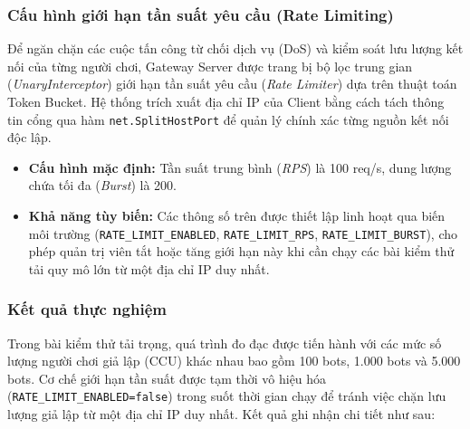 \documentclass[../Project.tex]{subfiles}
\begin{document}
\subsubsection{Cấu hình giới hạn tần suất yêu cầu (Rate Limiting)}
Để ngăn chặn các cuộc tấn công từ chối dịch vụ (DoS) và kiểm soát lưu lượng kết nối của từng người chơi, Gateway Server được trang bị bộ lọc trung gian (\textit{UnaryInterceptor}) giới hạn tần suất yêu cầu (\textit{Rate Limiter}) dựa trên thuật toán Token Bucket. Hệ thống trích xuất địa chỉ IP của Client bằng cách tách thông tin cổng qua hàm \texttt{net.SplitHostPort} để quản lý chính xác từng nguồn kết nối độc lập.
\begin{itemize}
    \item \textbf{Cấu hình mặc định:} Tần suất trung bình (\textit{RPS}) là 100 req/s, dung lượng chứa tối đa (\textit{Burst}) là 200.
    \item \textbf{Khả năng tùy biến:} Các thông số trên được thiết lập linh hoạt qua biến môi trường (\texttt{RATE\_\allowbreak LIMIT\_\allowbreak ENABLED}, \texttt{RATE\_\allowbreak LIMIT\_\allowbreak RPS}, \texttt{RATE\_\allowbreak LIMIT\_\allowbreak BURST}), cho phép quản trị viên tắt hoặc tăng giới hạn này khi cần chạy các bài kiểm thử tải quy mô lớn từ một địa chỉ IP duy nhất.
\end{itemize}

\subsubsection{Kết quả thực nghiệm}
Trong bài kiểm thử tải trọng, quá trình đo đạc được tiến hành với các mức số lượng người chơi giả lập (CCU) khác nhau bao gồm 100 bots, 1.000 bots và 5.000 bots. Cơ chế giới hạn tần suất được tạm thời vô hiệu hóa (\texttt{RATE\_\allowbreak LIMIT\_\allowbreak ENABLED=false}) trong suốt thời gian chạy để tránh việc chặn lưu lượng giả lập từ một địa chỉ IP duy nhất. Kết quả ghi nhận chi tiết như sau:
\end{document}
